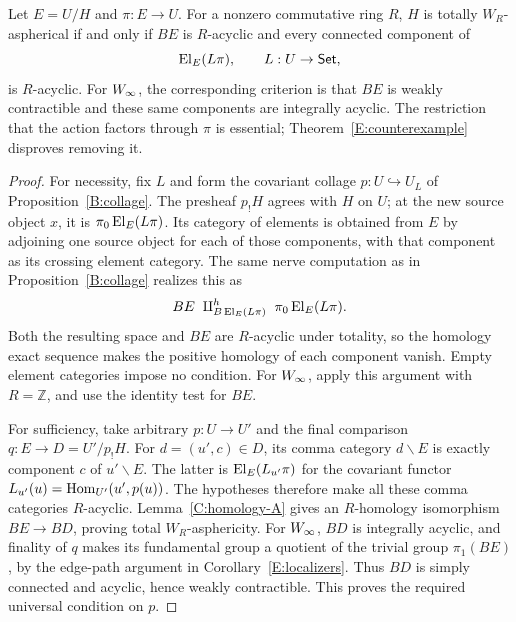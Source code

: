 \begin{proposition}\label{E:restricted-actions}
Let $E=U/H$ and $\pi:E\to U$. For a nonzero commutative ring $R$, $H$ is totally $W_R$-aspherical if and only if $BE$ is $R$-acyclic and every connected component of
\[
 \operatorname{El}_E(L\pi),\qquad L:U\to\mathsf{Set},
\]
is $R$-acyclic. For $W_{\infty}$, the corresponding criterion is that $BE$ is weakly contractible and these same components are integrally acyclic. The restriction that the action factors through $\pi$ is essential; Theorem~\ref{E:counterexample} disproves removing it.
\end{proposition}
\begin{proof}
For necessity, fix $L$ and form the covariant collage $p:U\hookrightarrow U_L$ of Proposition~\ref{B:collage}. The presheaf $p_!H$ agrees with $H$ on $U$; at the new source object $x$, it is $\pi_0\operatorname{El}_E(L\pi)$. Its category of elements is obtained from $E$ by adjoining one source object for each of those components, with that component as its crossing element category. The same nerve computation as in Proposition~\ref{B:collage} realizes this as
\[
 BE\ \amalg^{h}_{B\El_E(L\pi)}\ \pi_0\El_E(L\pi).
\]
Both the resulting space and $BE$ are $R$-acyclic under totality, so the homology exact sequence makes the positive homology of each component vanish. Empty element categories impose no condition. For $W_{\infty}$, apply this argument with $R=\mathbb Z$, and use the identity test for $BE$.

For sufficiency, take arbitrary $p:U\to U'$ and the final comparison $q:E\to D=U'/p_!H$. For $d=(u',c)\in D$, its comma category $d\backslash E$ is exactly component $c$ of $u'\backslash E$. The latter is $\operatorname{El}_E(L_{u'}\pi)$ for the covariant functor $L_{u'}(u)=\operatorname{Hom}_{U'}(u',p(u))$. The hypotheses therefore make all these comma categories $R$-acyclic. Lemma~\ref{C:homology-A} gives an $R$-homology isomorphism $BE\to BD$, proving total $W_R$-asphericity. For $W_{\infty}$, $BD$ is integrally acyclic, and finality of $q$ makes its fundamental group a quotient of the trivial group $\pi_1(BE)$, by the edge-path argument in Corollary~\ref{E:localizers}. Thus $BD$ is simply connected and acyclic, hence weakly contractible. This proves the required universal condition on $p$.
\end{proof}
